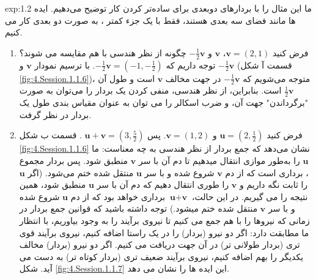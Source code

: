 {\begin{spacing}{1.5}
        \textbf{\vspace{-20pt}}
        \begin{example}{exp:1.2}
            \Large
            ما این مثال را با بردارهای دوبعدی برای ساده‌تر کردن کار توضیح می‌دهیم. ایده ها مانند فضای سه بعدی هستند، فقط با یک جزء کمتر ، به صورت دو بعدی کار می کنیم.\\
            \begin{enumerate}[label=\textbf{\arabic*}.]
                \item {فرض کنید $\textbf{v}=(2,1)$، $\textbf{v}$ و $-\frac{\displaystyle 1}{\displaystyle 2}\textbf{v}$ چگونه از نظر هندسی با هم مقایسه می شوند؟
                توجه داریم که $-\frac{\displaystyle 1}{\displaystyle 2}\textbf{v}=(-1,-\frac{\displaystyle 1}{\displaystyle 2})$.
                با ترسیم نمودار $\textbf{v}$ و $-\frac{\displaystyle 1}{\displaystyle 2}\textbf{v}$ (قسمت آ شکل \ref{fig:4.Session.1.1.6})،
                متوجه می‌شویم که $-\frac{\displaystyle 1}{\displaystyle 2}\textbf{v}$ در جهت مخالف $\textbf{v}$ است و طول آن $\frac{\displaystyle 1}{\displaystyle 2}\textbf{v}$ است.
                بنابراین، از نظر هندسی، منفی کردن یک بردار را می‌توان به صورت "برگرداندن" جهت آن،
                و ضرب اسکالر را می توان به عنوان مقیاس بندی طول یک بردار در نظر گرفت.}\\

                \item {فرض کنید $\textbf{u}=(2,\frac{\displaystyle 1}{\displaystyle 2})$ و $\textbf{v}=(1,2)$. پس $\textbf{u}+\textbf{v}=(3,\frac{\displaystyle 5}{\displaystyle 2})$ .
                قسمت ب شکل \ref{fig:4.Session.1.1.6} نشان می‌دهد که جمع بردار از نظر هندسی به چه معناست:
                ما $\textbf{u}$ را به‌طور موازی انتقال میدهیم تا دم آن با سر $\textbf{v}$ منطبق شود.
                پس بردار مجموع ، برداری است که از دم $\textbf{v}$ شروع شده و با سر $\textbf{u}$ منتقل شده ختم می‌شود.
                    (اگر $\textbf{u}$ را ثابت نگه داریم و $\textbf{v}$ را طوری انتقال دهیم که دم آن با سر $\textbf{u}$ منطبق شود، همین نتیجه را می گیریم.
                    در این حالت، $\textbf{u}+\textbf{v}$ برداری خواهد بود که از دم $\textbf{u}$ شروع شده و با سر $\textbf{v}$ منتقل شده ختم میشود.)
                    توجه داشته باشید که قوانین جمع بردار در زمانی که نیروها را با هم جمع می کنیم تا نیروی برآیند را به وجود بیاوریم، با انتظار ما مطابقت دارد:
                    اگر دو نیرو (بردار) را در یک راستا اضافه کنیم، نیروی برآیند قوی تری (بردار طولانی تر) در آن جهت دریافت می کنیم.
                    اگر دو نیرو (بردار) مخالف یکدیگر را بهم اضافه کنیم، نیروی برآیند ضعیف تری (بردار کوتاه تر) به دست می آید.
                    شکل \ref{fig:4.Session.1.1.7} این ایده ها را نشان می دهد.}\\


\end{enumerate}
\end{example}
\end{spacing}}
